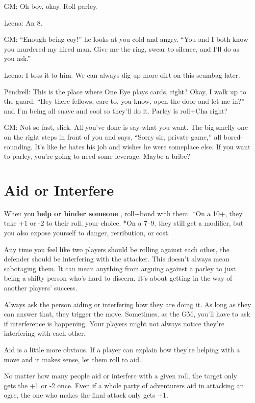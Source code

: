  GM: Oh boy, okay. Roll parley.


 Leena: An 8.


 GM: ``Enough being coy!'' he looks at you cold and angry. ``You and I both know you murdered my hired man. Give me the ring, swear to silence, and I'll do as you ask.''


 Leena: I toss it to him. We can always dig up more dirt on this scumbag later.


 Pendrell: This is the place where One Eye plays cards, right? Okay, I walk up to the guard. ``Hey there fellows, care to, you know, open the door and let me in?'' and I'm being all suave and cool so they'll do it. Parley is roll+Cha right?


 GM: Not so fast, slick. All you've done is say what you want. The big smelly one on the right steps in front of you and says, ``Sorry sir, private game,'' all bored-sounding. It's like he hates his job and wishes he were someplace else. If you want to parley, you're going to need some leverage. Maybe a bribe?
\section{Aid or Interfere}


 When you \textbf{help or hinder someone }
, roll+bond with them. *On a 10+, they take +1 or -2 to their roll, your choice. *On a 7--9, they still get a modifier, but you also expose yourself to danger, retribution, or cost.


 Any time you feel like two players should be rolling against each other, the defender should be interfering with the attacker. This doesn't always mean sabotaging them. It can mean anything from arguing against a parley to just being a shifty person who's hard to discern. It's about getting in the way of another players' success.


 Always ask the person aiding or interfering how they are doing it. As long as they can answer that, they trigger the move. Sometimes, as the GM, you'll have to ask if interference is happening. Your players might not always notice they're interfering with each other.


 Aid is a little more obvious. If a player can explain how they're helping with a move and it makes sense, let them roll to aid.


 No matter how many people aid or interfere with a given roll, the target only gets the +1 or -2 once. Even if a whole party of adventurers aid in attacking an ogre, the one who makes the final attack only gets +1.


